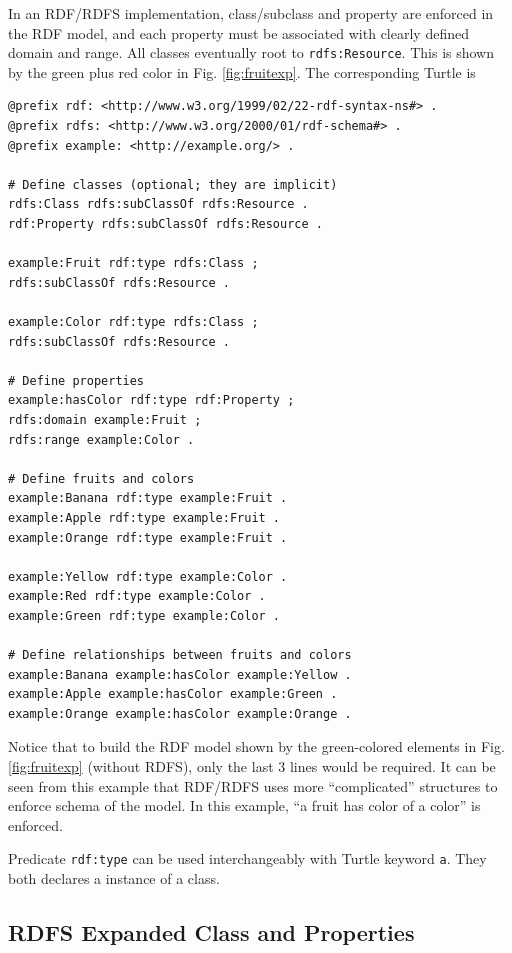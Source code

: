 In an RDF/RDFS implementation, class/subclass and property are enforced in the RDF model, and each property must be associated with clearly defined domain and range. All classes eventually root to \verb|rdfs:Resource|. This is shown by the green plus red color in Fig. \ref{fig:fruitexp}. The corresponding Turtle is
\begin{lstlisting}
@prefix rdf: <http://www.w3.org/1999/02/22-rdf-syntax-ns#> .
@prefix rdfs: <http://www.w3.org/2000/01/rdf-schema#> .
@prefix example: <http://example.org/> .

# Define classes (optional; they are implicit)
rdfs:Class rdfs:subClassOf rdfs:Resource .
rdf:Property rdfs:subClassOf rdfs:Resource .

example:Fruit rdf:type rdfs:Class ;
rdfs:subClassOf rdfs:Resource .

example:Color rdf:type rdfs:Class ;
rdfs:subClassOf rdfs:Resource .

# Define properties
example:hasColor rdf:type rdf:Property ;
rdfs:domain example:Fruit ;
rdfs:range example:Color .

# Define fruits and colors
example:Banana rdf:type example:Fruit .
example:Apple rdf:type example:Fruit .
example:Orange rdf:type example:Fruit .

example:Yellow rdf:type example:Color .
example:Red rdf:type example:Color .
example:Green rdf:type example:Color .

# Define relationships between fruits and colors
example:Banana example:hasColor example:Yellow .
example:Apple example:hasColor example:Green .
example:Orange example:hasColor example:Orange .

\end{lstlisting}
Notice that to build the RDF model shown by the green-colored elements in Fig. \ref{fig:fruitexp} (without RDFS), only the last 3 lines would be required. It can be seen from this example that RDF/RDFS uses more ``complicated'' structures to enforce schema of the model. In this example, ``a fruit has color of a color'' is enforced. 

Predicate \verb|rdf:type| can be used interchangeably with Turtle keyword \verb|a|. They both declares a instance of a class.

\subsection{RDFS Expanded Class and Properties}

